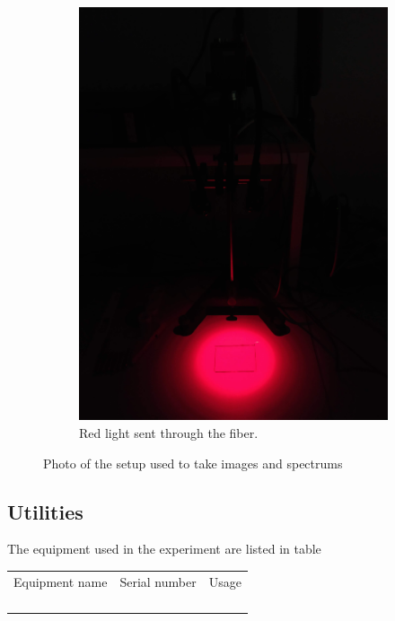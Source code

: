 \begin{figure}[h]
\begin{subfigure}{0.3333\textwidth}
        \includegraphics[width=0.95\linewidth]{figures/project_setup_red.png}
        \caption{Red light sent through the fiber.}
        \label{fig:picture_of_setup_red}
    \end{subfigure}
    \caption{Photo of the setup used to take images and spectrums}
    \label{fig:blue_cap_and_background}
\end{figure}

\subsection{Utilities}
The equipment used in the experiment are listed in table 

\begin{table}[]
    \begin{tabular}{lll}
    Equipment name & Serial number & Usage \\
                   &               &       \\
                   &               &       \\
                   &               &       \\
                   &               &      
    \end{tabular}
\end{table}

